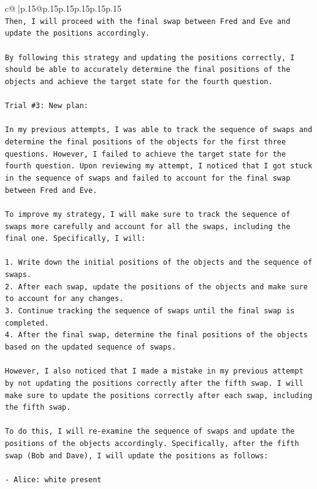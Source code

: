 \documentclass{article}
\begin{document}
{\begin{supertabular}{c@{$\;$}|p{.15\linewidth}@{}p{.15\linewidth}p{.15\linewidth}p{.15\linewidth}p{.15\linewidth}p{.15\linewidth}}
{{{\\ 
\texttt{Then, I will proceed with the final swap between Fred and Eve and update the positions accordingly.} \\
\\ 
\texttt{By following this strategy and updating the positions correctly, I should be able to accurately determine the final positions of the objects and achieve the target state for the fourth question.} \\
\\ 
\texttt{Trial \#3: New plan: } \\
\\ 
\texttt{In my previous attempts, I was able to track the sequence of swaps and determine the final positions of the objects for the first three questions. However, I failed to achieve the target state for the fourth question. Upon reviewing my attempt, I noticed that I got stuck in the sequence of swaps and failed to account for the final swap between Fred and Eve.} \\
\\ 
\texttt{To improve my strategy, I will make sure to track the sequence of swaps more carefully and account for all the swaps, including the final one. Specifically, I will:} \\
\\ 
\texttt{1. Write down the initial positions of the objects and the sequence of swaps.} \\
\texttt{2. After each swap, update the positions of the objects and make sure to account for any changes.} \\
\texttt{3. Continue tracking the sequence of swaps until the final swap is completed.} \\
\texttt{4. After the final swap, determine the final positions of the objects based on the updated sequence of swaps.} \\
\\ 
\texttt{However, I also noticed that I made a mistake in my previous attempt by not updating the positions correctly after the fifth swap. I will make sure to update the positions correctly after each swap, including the fifth swap.} \\
\\ 
\texttt{To do this, I will re{-}examine the sequence of swaps and update the positions of the objects accordingly. Specifically, after the fifth swap (Bob and Dave), I will update the positions as follows:} \\
\\ 
\texttt{{-} Alice: white present} \\
}}}
\end{supertabular}}
\end{document}
